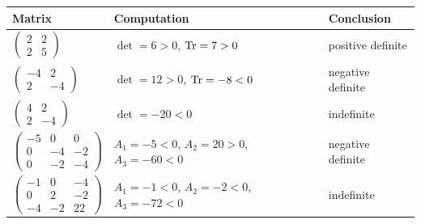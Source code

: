 \begin{example}
\begin{center}
\begin{tabular}{lll}
\textbf{Matrix} & \textbf{Computation} & \textbf{Conclusion} \\
\hline
$\left(\begin{smallmatrix}2&2\\2&5\end{smallmatrix}\right)$ & $\det = 6 > 0$, $\operatorname{Tr} = 7 > 0$ & positive definite \\
$\left(\begin{smallmatrix}-4&2\\2&-4\end{smallmatrix}\right)$ & $\det = 12 > 0$, $\operatorname{Tr} = -8 < 0$ & negative definite \\
$\left(\begin{smallmatrix}4&2\\2&-4\end{smallmatrix}\right)$ & $\det = -20 < 0$ & indefinite \\
$\left(\begin{smallmatrix}-5&0&0\\0&-4&-2\\0&-2&-4\end{smallmatrix}\right)$ & $A_1 = -5 < 0$, $A_2 = 20 > 0$, $A_3 = -60 < 0$ & negative definite \\
$\left(\begin{smallmatrix}-1&0&-4\\0&2&-2\\-4&-2&22\end{smallmatrix}\right)$ & $A_1 = -1 < 0$, $A_2 = -2 < 0$, $A_3 = -72 < 0$ & indefinite \\
\end{tabular}
\end{center}
\end{example}

